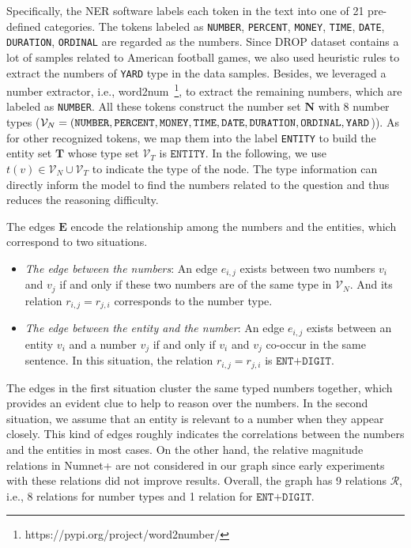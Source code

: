 \documentclass{article}
\begin{document}
Specifically, the NER software labels each token in the text into one of 21 pre-defined categories.
The tokens labeled as \texttt{NUMBER}, \texttt{PERCENT}, \texttt{MONEY}, \texttt{TIME}, \texttt{DATE}, \texttt{DURATION}, \texttt{ORDINAL} are regarded as the numbers.
Since DROP dataset contains a lot of samples related to American football games, we also used heuristic rules to extract the numbers of \texttt{YARD} type in the data samples.
Besides, we leveraged a number extractor, i.e., word2num~\footnote{https://pypi.org/project/word2number/}, to extract the remaining numbers, which are labeled as \texttt{NUMBER}.
All these tokens construct the number set $\mathbf{N}$ with 8 number types ($\mathcal{V}_N = (\texttt{NUMBER}, \texttt{PERCENT}, \texttt{MONEY}, \texttt{TIME}, \texttt{DATE}, \\ \texttt{DURATION},  \texttt{ORDINAL}, \texttt{YARD}$)). 
As for other recognized tokens,  we map them into the label \texttt{ENTITY} to build the entity set $\mathbf{T}$ whose type set $\mathcal{V}_T$ is $\texttt{ENTITY}$.
In the following, we use $t(v)\in \mathcal{V}_N \cup \mathcal{V}_T$ to indicate the type of the node.
The type information can directly inform the model to find the numbers related to the question and thus reduces the reasoning difficulty.

The edges $\mathbf{E}$ encode the relationship among the numbers and the entities, which correspond to two situations.
\begin{itemize}[leftmargin=*,nolistsep,nosep]
\setlength\itemsep{0.5em}
\item \textit{The edge between the numbers}: An edge $e_{i,j}$ exists between two numbers $v_i$ and $v_j$ if and only if these two numbers are of the same type in $\mathcal{V}_N$. And its relation $r_{i,j}=r_{j,i}$ corresponds to the number type.
\item \textit{The edge between the entity and the number}: An edge $e_{i,j}$ exists between an entity $v_i$ and a number $v_j$ if and only if $v_i$ and $v_j$ co-occur in the same sentence. In this situation, the relation $r_{i,j}=r_{j,i}$ is $\texttt{ENT+DIGIT}$.
\end{itemize}
The edges in the first situation cluster the same typed numbers together, which provides an evident clue to help to reason over the numbers.
In the second situation, we assume that an entity is relevant to a number when they appear closely.
This kind of edges roughly indicates the correlations between the numbers and the entities in most cases. On the other hand, the relative magnitude relations in Numnet+ are not considered in our graph since early experiments with these relations did not improve results.
Overall, the graph has 9 relations $\mathcal{R}$, i.e., 8 relations for number types and 1 relation for $\texttt{ENT+DIGIT}$. 
\end{document}

